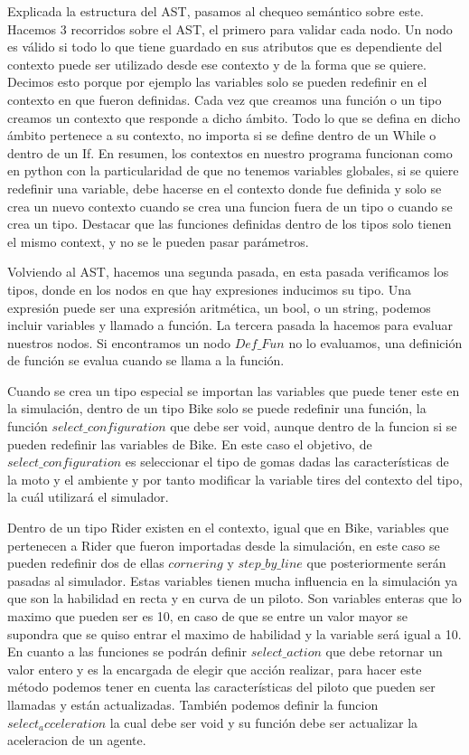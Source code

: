 \documentclass[12pt, letterpaper,spanish]{article}
\theoremstyle{definition}
\theoremstyle{remark}
\begin{document}
	Explicada la estructura del AST, pasamos al chequeo semántico sobre este. Hacemos 3 recorridos sobre el AST, el primero para validar cada nodo. Un nodo es válido si todo lo que tiene guardado en sus atributos que es dependiente del contexto puede ser utilizado desde ese contexto y de la forma que se quiere. Decimos esto porque por ejemplo las variables solo se pueden redefinir en el contexto en que fueron definidas. Cada vez que creamos una función o un tipo creamos un contexto que responde a dicho ámbito. Todo lo que se defina en dicho ámbito pertenece a su contexto, no importa si se define dentro de un While o dentro de un If. En resumen, los contextos en nuestro programa funcionan como en python con la particularidad de que no tenemos variables globales, si se quiere redefinir una variable, debe hacerse en el contexto donde fue definida y solo se crea un nuevo contexto cuando se crea una funcion fuera de un tipo o cuando se crea un tipo. Destacar que las funciones definidas dentro de los tipos solo tienen el mismo context, y no se le pueden pasar parámetros.
	
	Volviendo al AST, hacemos una segunda pasada, en esta pasada verificamos los tipos, donde en los nodos en que hay expresiones inducimos su tipo. Una expresión puede ser una expresión aritmética, un bool, o un string, podemos incluir variables y llamado a función. La tercera pasada la hacemos para evaluar nuestros nodos. Si encontramos un nodo $Def\_Fun$ no lo evaluamos, una definición de función se evalua cuando se llama a la función.
	
	Cuando se crea un tipo especial se importan las variables que puede tener este en la simulación, dentro de un tipo Bike solo se puede redefinir una función, la función $select\_configuration$ que debe ser void, aunque dentro de la funcion si se pueden redefinir las variables de Bike. En este caso el objetivo, de $select\_configuration$ es seleccionar el tipo de gomas dadas las características de la moto y el ambiente y por tanto modificar la variable tires del contexto del tipo, la cuál utilizará el simulador. 
	
	Dentro de un tipo Rider existen en el contexto, igual que en Bike, variables que pertenecen a Rider que fueron importadas desde la simulación, en este caso se pueden redefinir dos de ellas $cornering$ y $step\_by\_line$ que posteriormente serán pasadas al simulador. Estas variables tienen mucha influencia en la simulación ya que son la habilidad en recta y en curva de un piloto. Son variables enteras que lo maximo que pueden ser es 10, en caso de que se entre un valor mayor se supondra que se quiso entrar el maximo de habilidad y la variable será igual a 10. En cuanto a las funciones se podrán definir $select\_action$ que debe retornar un valor entero y es la encargada
	de elegir que acción realizar, para hacer este método podemos tener en cuenta las características del piloto que pueden ser llamadas y están actualizadas. También podemos definir la funcion $select_acceleration$ la cual debe ser void y su función debe ser actualizar la aceleracion de un agente.
	
\end{document}
